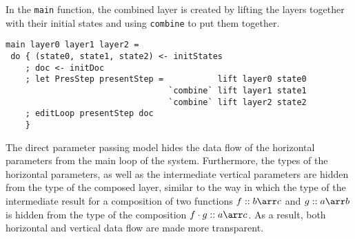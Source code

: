 \par In the \texttt{main} function, the combined layer is created by lifting
      the layers together with their initial states and using \texttt{combine} to put
      them together.\begin{small}\begin{verbatim}main layer0 layer1 layer2 =
 do { (state0, state1, state2) <- initStates
    ; doc <- initDoc 
    ; let PresStep presentStep =           lift layer0 state0 
                                 `combine` lift layer1 state1
                                 `combine` lift layer2 state2
    ; editLoop presentStep doc
    }\end{verbatim}\end{small}

\par {}The direct parameter passing model
      hides the data flow of the horizontal parameters from the main loop of the
      system. Furthermore, the types of the horizontal parameters, as well as the
      intermediate vertical parameters are hidden from the type of the composed
      layer, similar to the way in which the type of the intermediate result for a
      composition of two functions $f :: b \arr c$ and $g :: a \arr b$ is hidden from
      the type of the composition $f \cdot g :: a \arr c$. As a result, both
      horizontal and vertical data flow are made more transparent.
\par 
\par 
\par 
